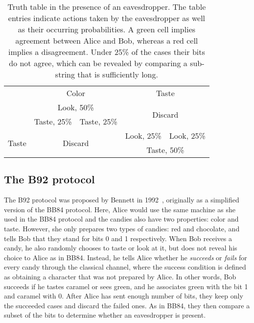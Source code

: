 \documentclass{article}
\begin{document}
\begin{table}[h!]
	\centering
	\begin{tabular}{ |c | c|c|c|c| } 
		\hline
		\backslashbox{Bob}{Alice} & \multicolumn{2}{|c|}{Color} & \multicolumn{2}{|c|}{Taste} \\ 
		\hhline{*{5}{-}}
		\multirow{2}{5em}{Look} &  \multicolumn{2}{|c|}{ \cellcolor[HTML]{9af9a1} Look, 50\% } & \multicolumn{2}{|c|}{\multirow{2}{*}{Discard}} \\
		\cline{2-3}
		& \cellcolor[HTML]{f7bebe} Taste, 25\% & \cellcolor[HTML]{9af9a1} Taste, 25\% & \multicolumn{2}{|c|}{} \\
		\hline
		\multirow{2}{5em}{Taste} & \multicolumn{2}{|c|}{\multirow{2}{*}{Discard}} & \cellcolor[HTML]{f7bebe} Look, 25\% & \cellcolor[HTML]{9af9a1} Look, 25\% \\ 
		\hhline{| ~ | ~  ~ | - | - |}
		& \multicolumn{2}{|c|}{} & \multicolumn{2}{|c|}{ \cellcolor[HTML]{9af9a1} Taste, 50\%} \\
		\hline
	\end{tabular}
	\caption{Truth table in the presence of an eavesdropper. The table entries indicate actions taken by the eavesdropper as well as their occurring probabilities. A green cell implies agreement between Alice and Bob, whereas a red cell implies a disagreement. Under 25\% of the cases their bits do not agree, which can be revealed by comparing a sub-string that is sufficiently long.}
	\label{table2}
\end{table}

\subsection{The B92 protocol}
The B92 protocol was proposed by Bennett in 1992~\cite{bennett1992quantum}, originally as a simplified version of the BB84 protocol.
Here, Alice would use the same machine as she used in the BB84 protocol and the candies also have two properties: color and taste.
However, she only prepares two types of candies: red and chocolate, and tells Bob that they stand for bits 0 and 1 respectively.
When Bob receives a candy, he also randomly chooses to taste or look at it, but does not reveal his choice to Alice as in BB84.
Instead, he tells Alice whether he \textit{succeeds} or \textit{fails} for every candy through the classical channel, where the success condition is defined as obtaining a character that was not prepared by Alice.
In other words, Bob succeeds if he tastes caramel or sees green, and he associates green with the bit 1 and caramel with 0.
After Alice has sent enough number of bits, they keep only the succeeded cases and discard the failed ones.
As in BB84, they then compare a subset of the bits to determine whether an eavesdropper is present.
\end{document}
